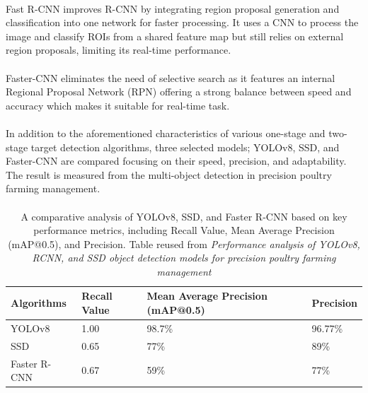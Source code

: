\paragraph*{}
Fast R-CNN improves R-CNN by integrating region proposal generation and classification into one network for faster processing. It uses a CNN to process the image and classify ROIs from a shared feature map but still relies on external region proposals, limiting its real-time performance\cite{girshick2015fast}.

\paragraph*{}
Faster-CNN eliminates the need of selective search as it features an internal Regional Proposal Network (RPN) offering a strong balance between speed and accuracy which makes it suitable for real-time task\cite{ren2015faster}.
     
\paragraph*{}
In addition to the aforementioned characteristics of various one-stage and two-stage target detection algorithms, three selected models; YOLOv8, SSD, and Faster-CNN are compared focusing on their speed, precision, and adaptability. The result is measured from the multi-object detection in precision poultry farming management. 

\paragraph*{}

\begin{table}[!h]
\centering
\begin{tabular}{| p{3.5cm} | p{3cm} | p{4cm} | p{3.5cm} |}
    \hline
    Algorithms  & Recall Value  & Mean Average Precision (mAP@0.5)  & Precision \\ \hline
    YOLOv8  & 1.00  & 98.7\%  & 96.77\% \\ \hline
    SSD  & 0.65  & 77\%  & 89\% \\ \hline
    Faster R-CNN  & 0.67  & 59\%  & 77\% \\ \hline
\end{tabular}
\caption{A comparative analysis of YOLOv8, SSD, and Faster R-CNN based on key performance metrics, including Recall Value, Mean Average Precision (mAP@0.5), and Precision. Table reused from \textit{Performance analysis of YOLOv8, RCNN, and SSD object detection models for precision poultry farming management}\cite{kaliappan2023performance}}
\label{tab:performance_metrics}
\end{table}

